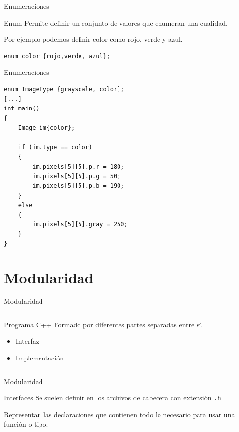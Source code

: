 \documentclass[aspectratio=169,presentation]{beamer}
\begin{document}
\begin{frame}[label={sec:org625c113},fragile]{Enumeraciones}
 \begin{block}{Enum}
Permite definir un conjunto de valores que enumeran una cualidad.

Por ejemplo podemos definir color como rojo, verde y azul.
\end{block}
\begin{block}{}
\begin{verbatim}
enum color {rojo,verde, azul};
\end{verbatim}
\end{block}
\end{frame}
\begin{frame}[label={sec:orgdb26007},fragile]{Enumeraciones}
 \begin{verbatim}
enum ImageType {grayscale, color};
[...]
int main()
{
	Image im{color};

	if (im.type == color)
	{
		im.pixels[5][5].p.r = 180;
		im.pixels[5][5].p.g = 50;
		im.pixels[5][5].p.b = 190;
	}
	else
	{
		im.pixels[5][5].gray = 250;
	}
}
\end{verbatim}
\end{frame}

\section{Modularidad}
\label{sec:org3ce2ff1}
\begin{frame}[label={sec:org47a6bc9}]{Modularidad}
\begin{columns}
\begin{column}{0.48\columnwidth}
\begin{block}{Programa C++}
Formado por diferentes partes separadas entre sí.
\begin{itemize}
\item Interfaz
\item Implementación
\end{itemize}
\end{block}
\end{column}
\end{columns}
\end{frame}
\begin{frame}[label={sec:orge4d29e2},fragile]{Modularidad}
 \begin{block}{Interfaces}
Se suelen definir en los archivos de cabecera con extensión \texttt{.h}

Representan las declaraciones que contienen todo lo
necesario para usar una función o tipo.
\end{block}
\end{frame}
\end{document}
